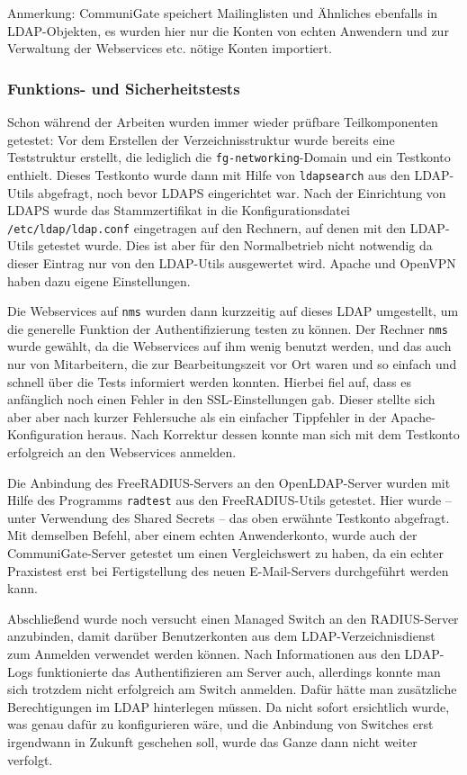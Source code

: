 \documentclass[11pt,a4paper,titlepage=firstiscover,headsepline,bibtotoc]{scrartcl} %
\begin{document}
Anmerkung: CommuniGate speichert Mailinglisten und Ähnliches ebenfalls in LDAP-Objekten, es wurden hier nur die Konten von echten Anwendern und zur Verwaltung der Webservices etc. nötige Konten importiert.

\subsubsection{Funktions- und Sicherheitstests}
Schon während der Arbeiten wurden immer wieder prüfbare Teilkomponenten getestet: 
Vor dem Erstellen der Verzeichnisstruktur wurde bereits eine Teststruktur erstellt, die lediglich die \texttt{fg-networking}-Domain und ein Testkonto enthielt. Dieses Testkonto wurde dann mit Hilfe von \texttt{ldapsearch} aus den LDAP-Utils abgefragt, noch bevor LDAPS eingerichtet war. Nach der Einrichtung von LDAPS wurde das Stammzertifikat in die Konfigurationsdatei \texttt{/etc/ldap/ldap.conf} eingetragen auf den Rechnern, auf denen mit den LDAP-Utils getestet wurde. Dies ist aber für den Normalbetrieb nicht notwendig da dieser Eintrag nur von den LDAP-Utils ausgewertet wird. Apache und OpenVPN haben dazu eigene Einstellungen.

Die Webservices auf \texttt{nms} wurden dann kurzzeitig auf dieses LDAP umgestellt, um die generelle Funktion der Authentifizierung testen zu können. Der Rechner \texttt{nms} wurde gewählt, da die Webservices auf ihm wenig benutzt werden, und das auch nur von Mitarbeitern, die zur Bearbeitungszeit vor Ort waren und so einfach und schnell über die Tests informiert werden konnten. Hierbei fiel auf, dass es anfänglich noch einen Fehler in den SSL-Einstellungen gab. Dieser stellte sich aber aber nach kurzer Fehlersuche als ein einfacher Tippfehler in der Apache-Konfiguration heraus. Nach Korrektur dessen konnte man sich mit dem Testkonto erfolgreich an den Webservices anmelden.

Die Anbindung des FreeRADIUS-Servers an den OpenLDAP-Server wurden mit Hilfe des Programms \texttt{radtest} aus den FreeRADIUS-Utils getestet. Hier wurde -- unter Verwendung des Shared Secrets -- das oben erwähnte Testkonto abgefragt. Mit demselben Befehl, aber einem echten Anwenderkonto, wurde auch der CommuniGate-Server getestet um einen Vergleichswert zu haben, da ein echter Praxistest erst bei Fertigstellung des neuen E-Mail-Servers durchgeführt werden kann.

Abschließend wurde noch versucht einen Managed Switch an den RADIUS-Server anzubinden, damit darüber Benutzerkonten aus dem LDAP-Verzeichnisdienst zum Anmelden verwendet werden können. Nach Informationen aus den LDAP-Logs funktionierte das Authentifizieren am Server auch, allerdings konnte man sich trotzdem nicht erfolgreich am Switch anmelden. Dafür hätte man zusätzliche Berechtigungen im LDAP hinterlegen müssen. Da nicht sofort ersichtlich wurde, was genau dafür zu konfigurieren wäre, und die Anbindung von Switches erst irgendwann in Zukunft geschehen soll, wurde das Ganze dann nicht weiter verfolgt.
\end{document}

